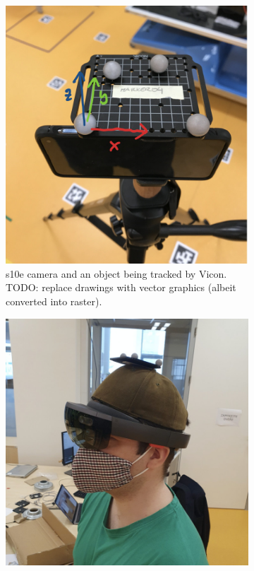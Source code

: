 \documentclass[twoside]{ctuthesis}
\theoremstyle{plain}
\theoremstyle{definition}
\theoremstyle{note}
\begin{document}
\begin{figure}
	\begin{subfigure}{0.45\textwidth}
		\includegraphics[width=\textwidth]{s10e_beacon}
		\caption{s10e camera and an object being tracked by Vicon. TODO: replace drawings with vector graphics (albeit converted into raster).}
		\label{fig:s10e-tracker}
	\end{subfigure}
	\hspace*{\fill}	%
	\begin{subfigure}{0.45\textwidth}
		\includegraphics[width=\textwidth]{holoLens1_beacon}

\end{subfigure}
\end{figure}
\end{document}
